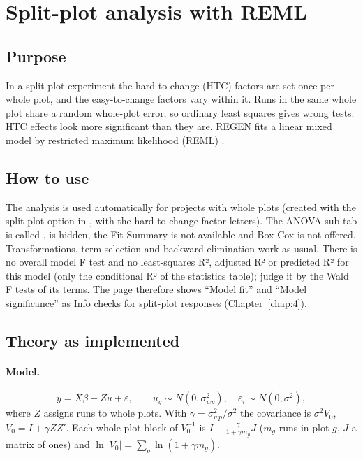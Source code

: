 \section{Split-plot analysis with REML}\label{sec:ch05-reml}

\subsection*{Purpose}
In a split-plot experiment the hard-to-change (HTC) factors are set once per whole plot, and the
easy-to-change factors vary within it. Runs in the same whole plot share a random whole-plot error, so
ordinary least squares gives wrong tests: HTC effects look more significant than they are. REGEN fits a
linear mixed model by restricted maximum likelihood (REML) \citep{patterson1971,goos2011}.

\subsection*{How to use}
The analysis is used automatically for projects with whole plots (created with the split-plot option in
, with the hard-to-change factor letters). The ANOVA sub-tab is called
,  is hidden, the Fit Summary is not available and Box-Cox is
not offered. Transformations, term selection and backward elimination work as usual. There is no overall
model F test and no least-squares R², adjusted R² or predicted R² for this model (only the conditional R² of
the statistics table); judge it by the Wald F tests of its terms. The
 page therefore shows ``Model fit'' and ``Model significance'' as Info checks for split-plot
responses (Chapter~\ref{chap:4}).

\subsection*{Theory as implemented}
\paragraph{Model.}
\begin{equation}
  y=X\beta+Zu+\varepsilon,\qquad u_g\sim N(0,\sigma^2_{wp}),\quad \varepsilon_i\sim N(0,\sigma^2),
  \label{eq:ch05-mixed}
\end{equation}
where $Z$ assigns runs to whole plots. With $\gamma=\sigma^2_{wp}/\sigma^2$ the covariance is
$\sigma^2V_0$, $V_0=I+\gamma ZZ'$. Each whole-plot block of $V_0^{-1}$ is
$I-\frac{\gamma}{1+\gamma m_g}J$ ($m_g$ runs in plot $g$, $J$ a matrix of ones) and
$\ln|V_0|=\sum_g\ln(1+\gamma m_g)$.

